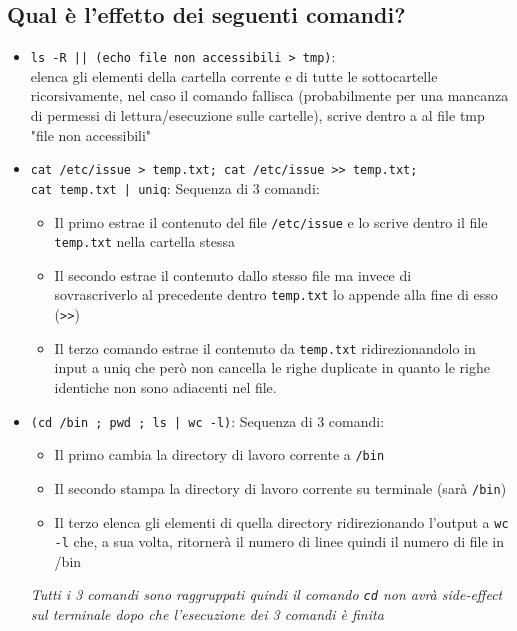 \documentclass{article}
\begin{document}
\subsection{Qual è l'effetto dei seguenti comandi?}
\begin{itemize}
    \item \texttt{ls -R || (echo file non accessibili > tmp)}:\\ elenca gli elementi della cartella corrente
    e di tutte le sottocartelle ricorsivamente, nel caso il comando fallisca 
    (probabilmente per una mancanza di permessi di lettura/esecuzione sulle cartelle), scrive dentro a al file tmp "file non accessibili"
    \item \texttt{cat /etc/issue > temp.txt; cat /etc/issue >> temp.txt;\\ cat temp.txt | uniq}:
    Sequenza di 3 comandi:
    \begin{itemize}
        \item Il primo estrae il contenuto del file \texttt{/etc/issue} e lo scrive dentro il file \texttt{temp.txt} nella cartella stessa
        \item Il secondo estrae il contenuto dallo stesso file ma invece di\\ sovrascriverlo al precedente dentro \texttt{temp.txt} lo appende 
        alla fine di esso (\texttt{>>})
        \item Il terzo comando estrae il contenuto da \texttt{temp.txt} ridirezionandolo in input a uniq che però non cancella 
        le righe duplicate in quanto le righe identiche non sono adiacenti nel file.
    \end{itemize}
    \item \texttt{(cd /bin ; pwd ; ls | wc -l)}:
    Sequenza di 3 comandi:
    \begin{itemize}
        \item Il primo cambia la directory di lavoro corrente a \texttt{/bin}
        \item Il secondo stampa la directory di lavoro corrente su terminale (sarà \texttt{/bin})
        \item Il terzo elenca gli elementi di quella directory ridirezionando l'output a \texttt{wc -l} 
        che, a sua volta, ritornerà il numero di linee quindi il numero di file in /bin
    \end{itemize}
    \textit{Tutti i 3 comandi sono raggruppati quindi il comando \texttt{cd} 
    non avrà side-effect sul terminale dopo che l'esecuzione dei 3 comandi è finita}
\end{itemize}
\end{document}
